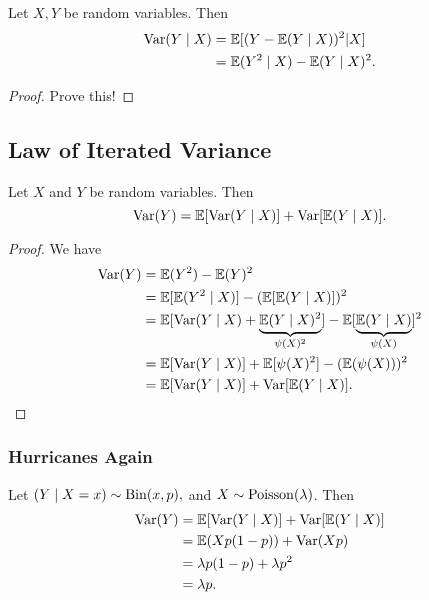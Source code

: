 \begin{eg}
Let $X,Y$ be random variables. Then
\begin{align*}
    \operatorname*{Var}(Y\mid X)&=\mathbb E[(Y-\mathbb E(Y\mid X))^2|X] \\
    &=\mathbb E(Y^2\mid X)-\mathbb E(Y\mid X)^2.
\end{align*}
\end{eg}

\begin{proof}
		Prove this!
\end{proof}

\subsection{Law of Iterated Variance}
\label{ssec:LoIV}
\begin{prop}
Let $X$ and $Y$ be random variables. Then
$$\operatorname*{Var}(Y)=\mathbb E[\operatorname*{Var}(Y\mid X)]+\operatorname*{Var}[\mathbb E(Y\mid X)].$$
\end{prop}

\begin{proof}
		We have
\begin{align*}
    \operatorname*{Var}(Y)&=\mathbb E(Y^2)-\mathbb E(Y)^2 \\
    &= \mathbb E[\mathbb E(Y^2\mid X)]-(\mathbb E[\mathbb E(Y\mid X)])^2 \\
    &= \mathbb E[\operatorname*{Var}(Y\mid X)+\underbrace{\mathbb E(Y\mid X)^2}_{\psi(X)^2}]-\mathbb E[\underbrace{\mathbb E(Y\mid X)}_{\psi(X)}]^2 \\
    &=\mathbb E[\operatorname*{Var}(Y\mid X)]+\mathbb E[\psi(X)^2]-(\mathbb E(\psi(X)))^2 \\
    &=\mathbb E[\operatorname*{Var}(Y\mid X)]+\operatorname*{Var}[\mathbb E(Y\mid X)].
\end{align*}
\end{proof}
\subsubsection{Hurricanes Again}
\begin{eg}
Let $(Y\mid X=x)\sim \operatorname*{Bin} (x,p),$ and $X\sim \operatorname*{Poisson}(\lambda)$. Then
\begin{align*}
    \operatorname*{Var}(Y)&=\mathbb E[\operatorname*{Var}(Y\mid X)]+\operatorname*{Var}[\mathbb E(Y\mid X)] \\
    &=\mathbb E(Xp(1-p))+\operatorname*{Var}(Xp) \\
    &=\lambda p(1-p)+\lambda p^2 \\
    &=\lambda p.
\end{align*}
\end{eg}
